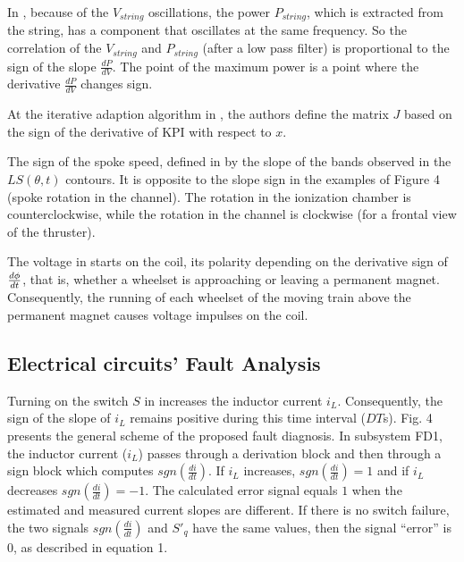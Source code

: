 \documentclass[11pt]{book}
\begin{document}
In \cite{kustanovich2018synchronverter}, because of the $V_{string}$
oscillations, the power $P_{string}$, which is extracted from the
string, has a component that oscillates at the same frequency. So
the correlation of the $V_{string}$ and $P_{string}$ (after a low
pass filter) is proportional to the sign of the slope $\frac{dP}{dV}$.
The point of the maximum power is a point where the derivative $\frac{dP}{dV}$
changes sign.

At the iterative adaption algorithm in \cite{khodapanah2019slice},
the authors define the matrix $J$ based on the sign of the derivative
of KPI with respect to $x$.

The sign of the spoke speed, defined in \cite{ortega2019influence}
by the slope of the bands observed in the $LS\left(\theta,t\right)$
contours. It is opposite to the slope sign in the examples of Figure
4 (spoke rotation in the channel). The rotation in the ionization
chamber is counterclockwise, while the rotation in the channel is
clockwise (for a frontal view of the thruster).

The voltage in \cite{sergeyev2019autonomous} starts on the coil,
its polarity depending on the derivative sign of $\frac{d\text{\ensuremath{\phi}}}{dt}$,
that is, whether a wheelset is approaching or leaving a permanent
magnet. Consequently, the running of each wheelset of the moving train
above the permanent magnet causes voltage impulses on the coil.


\subsection{Electrical circuits' Fault Analysis}

Turning on the switch $S$ in \cite{shahbazi2012open} increases the
inductor current $i_{L}$. Consequently, the sign of the slope of
$i_{L}$ remains positive during this time interval ($DT$s). Fig.
4 presents the general scheme of the proposed fault diagnosis. In
subsystem FD1, the inductor current ($i_{L}$) passes through a derivation
block and then through a sign block which computes $sgn\left(\frac{di}{dt}\right)$.
If $i_{L}$ increases, $sgn\left(\frac{di}{dt}\right)=1$ and if $i_{L}$
decreases $sgn\left(\frac{di}{dt}\right)=-1$. The calculated error
signal equals $1$ when the estimated and measured current slopes
are different. If there is no switch failure, the two signals $sgn\left(\frac{di}{dt}\right)$
and $S'_{q}$ have the same values, then the signal ``error'' is
$0$, as described in equation 1.
\end{document}
